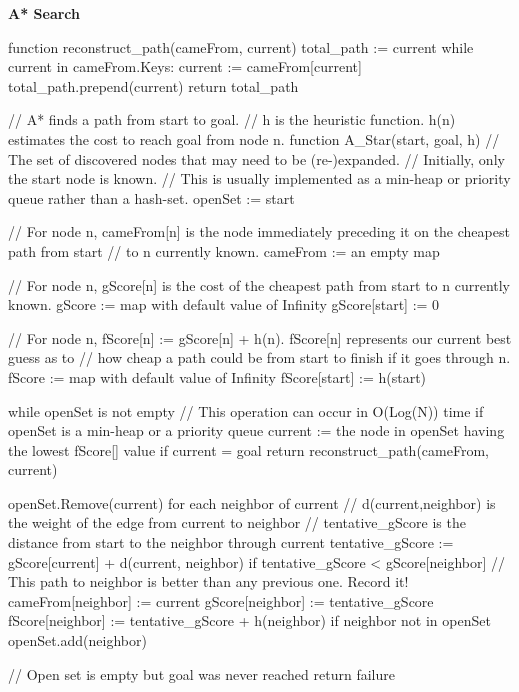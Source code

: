 \begin{FlushLeft}
    \textbf{A* Search} \\
    \begin{pseudocode}
function reconstruct_path(cameFrom, current)
    total_path := {current}
    while current in cameFrom.Keys:
        current := cameFrom[current]
        total_path.prepend(current)
    return total_path

// A* finds a path from start to goal.
// h is the heuristic function. h(n) estimates the cost to reach goal from node n.
function A_Star(start, goal, h)
    // The set of discovered nodes that may need to be (re-)expanded.
    // Initially, only the start node is known.
    // This is usually implemented as a min-heap or priority queue rather than a hash-set.
    openSet := {start}

    // For node n, cameFrom[n] is the node immediately preceding it on the cheapest path from start
    // to n currently known.
    cameFrom := an empty map

    // For node n, gScore[n] is the cost of the cheapest path from start to n currently known.
    gScore := map with default value of Infinity
    gScore[start] := 0

    // For node n, fScore[n] := gScore[n] + h(n). fScore[n] represents our current best guess as to
    // how cheap a path could be from start to finish if it goes through n.
    fScore := map with default value of Infinity
    fScore[start] := h(start)

    while openSet is not empty
        // This operation can occur in O(Log(N)) time if openSet is a min-heap or a priority queue
        current := the node in openSet having the lowest fScore[] value
        if current = goal
            return reconstruct_path(cameFrom, current)

        openSet.Remove(current)
        for each neighbor of current
            // d(current,neighbor) is the weight of the edge from current to neighbor
            // tentative_gScore is the distance from start to the neighbor through current
            tentative_gScore := gScore[current] + d(current, neighbor)
            if tentative_gScore < gScore[neighbor]
                // This path to neighbor is better than any previous one. Record it!
                cameFrom[neighbor] := current
                gScore[neighbor] := tentative_gScore
                fScore[neighbor] := tentative_gScore + h(neighbor)
                if neighbor not in openSet
                    openSet.add(neighbor)

    // Open set is empty but goal was never reached
    return failure
    \end{pseudocode} \\ \BK


\end{FlushLeft}
